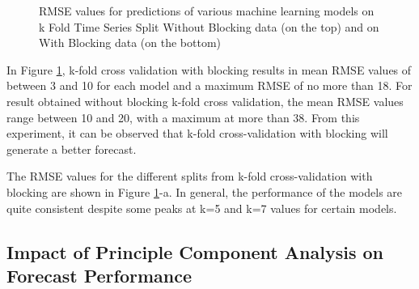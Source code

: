 \documentclass[conference]{IEEEtran}
\begin{document}
\begin{figure}
	\caption{RMSE values for predictions of various machine learning models on k Fold Time Series Split Without Blocking data (on the top) and on With Blocking data (on the bottom)}
	\label{figure:RMSE_blocking_no_blocking}
\end{figure}

In Figure \ref{figure:RMSE_blocking_no_blocking}, k-fold cross validation with blocking results in mean RMSE values of between 3 and 10 for each model and a maximum RMSE of no more than 18. For result obtained without blocking k-fold cross validation, the mean RMSE values range between 10 and 20, with a maximum at more than 38. From this experiment, it can be observed that k-fold cross-validation with blocking will generate a better forecast. 

The RMSE values for the different splits from k-fold cross-validation with blocking are shown in Figure  \ref{figure:RMSE_blocking_no_blocking}-a. In general, the performance of the models are quite consistent despite some peaks at k=5 and k=7 values for certain models. 

\subsection{Impact of Principle Component Analysis on Forecast Performance}
\end{document}
